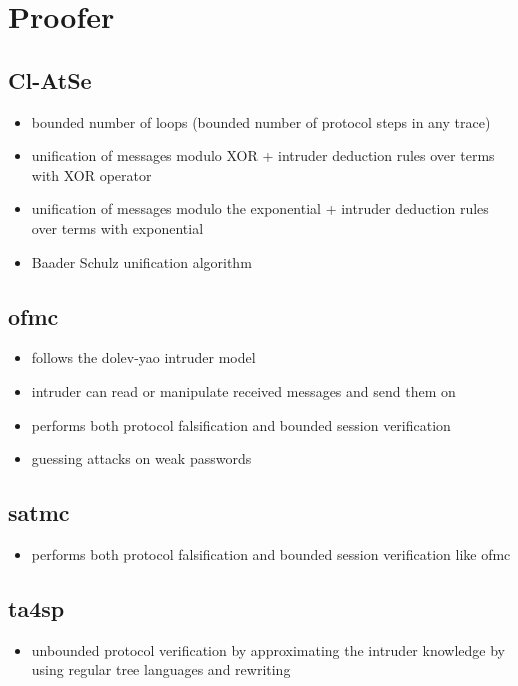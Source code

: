 \section{Proofer}
\subsection{Cl-AtSe}
\begin{itemize}
\item bounded number of loops (bounded number of protocol steps in any trace)
\item unification of messages modulo XOR + intruder deduction rules over terms with XOR operator
\item unification of messages modulo the exponential + intruder deduction rules over terms with exponential
\item Baader Schulz unification algorithm
\end{itemize}
\subsection{ofmc}
\begin{itemize}
\item follows the dolev-yao intruder model
\item intruder can read or manipulate received messages and send them on
\item performs both protocol falsification and bounded session verification
\item guessing attacks on weak passwords
\end{itemize}
\subsection{satmc}
\begin{itemize}
\item performs both protocol falsification and bounded session verification like ofmc
\end{itemize}
\subsection{ta4sp}
\begin{itemize}
\item unbounded protocol verification by approximating the intruder knowledge by using regular tree languages and rewriting
\end{itemize}